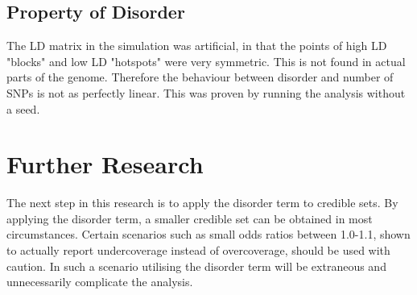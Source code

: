 \subsection{Property of Disorder}
The LD matrix in the simulation was artificial, in that the points of high LD "blocks" and low LD "hotspots" were very symmetric. This is not found in actual parts of the genome. Therefore the behaviour between disorder and number of SNPs is not as perfectly linear. This was proven by running the analysis without a seed. 


\section{Further Research}
The next step in this research is to apply the disorder term to credible sets. By applying the disorder term, a smaller credible set can be obtained in most circumstances. Certain scenarios such as small odds ratios between 1.0-1.1, shown to actually report undercoverage instead of overcoverage, should be used with caution. In such a scenario utilising the disorder term will be extraneous and unnecessarily complicate the analysis. 

